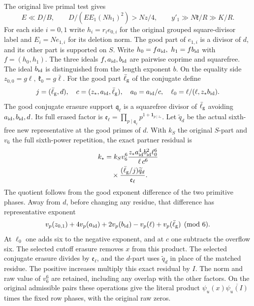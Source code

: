 The original live primal test gives
\begin{equation}\label{pca:detail-primal}
 E\ll D/B,\qquad
 D/(E E_1(Nh_1)^2)>Nz/4,\qquad y'_1\gg N\mathfrak k/R\gg K/R .
\end{equation}
For each side \(i=0,1\) write \(h_i=r_i e_{0,i}\) for
the original grouped square-divisor label and \(E_i=Ne_{1,i}\)
for its deletion norm. The good part of \(e_{1,i}\) is a divisor
of \(d\), and its other part is supported on \(S\).
Write \(h_0=f a_{\rm id},\ h_1=f b_{\rm id}\) with
\(f=(h_0,h_1)\). The three ideals \(f,a_{\rm id},b_{\rm id}\)
are pairwise coprime and squarefree. The ideal \(b_{\rm id}\)
is distinguished from the length exponent \(b\).
On the equality side \(z_{0,0}=g\ell,\ \mathfrak k_0=g\bar\ell\).
For the good part \(\bar\ell_{\rm g}\) of the conjugate define
\[
 j=(\bar\ell_{\rm g},d),\quad c=(z_*,a_{\rm id},\bar\ell_{\rm g}),
 \quad a_0=a_{\rm id}/c,\quad
 \ell_0=\ell/(\ell,z_*b_{\rm id}).
\]
The good conjugate erasure support \(\mathfrak q_\ell\) is a
squarefree divisor of \(\bar\ell_{\rm g}\) avoiding
\(a_{\rm id},b_{\rm id},d\). Its full erased factor is
\(\mathfrak e_\ell=\prod_{p\mid\mathfrak q_\ell}
 p^{1+\mathbf1_{p\mid z_*}}\).
Let \(\widetilde q_d\) be the actual sixth-free new
representative at the good primes of \(d\).
With \(k_S\) the original \(S\)-part and \(v_6\) the full
sixth-power repetition, the exact partner residual is
\begin{equation}\label{pca:detail-partner-residual}
 \begin{aligned}
 k_*&=k_S v_6^6
 \frac{z_*a_{\rm id}^{4}b_{\rm id}^{2}\ell_0^6}{\ell\,c^6}\\
 &\quad{}\times
 \frac{(\bar\ell_{\rm g}/j)\widetilde q_d}{\mathfrak e_\ell}.
 \end{aligned}
\end{equation}
The quotient follows from the good exponent difference of the
two primitive phases. Away from \(d\), before changing any
residue, that difference has representative exponent
\[
 v_p(z_{0,1})+4v_p(a_{\rm id})+2v_p(b_{\rm id})
                  -v_p(\ell)+v_p(\bar\ell_{\rm g})\pmod 6.
\]
At \(\ell_0\) one adds six to the negative exponent, and
at \(c\) one subtracts the overflow six. The selected
cutoff erasure removes \(x\) from this product.
The selected conjugate erasure divides by
\(\mathfrak e_\ell\), and the \(d\)-part uses
\(\widetilde q_d\) in place of the matched residue.
The positive increases multiply this exact residual by \(I\).
The norm and raw value of \(v_6^6\) are retained, including
any overlap with the other factors. On the original admissible
pairs these operations give the literal product
\(\psi_u(x)\overline{\psi_u(I)}\) times the fixed row phases,
with the original raw zeros.

